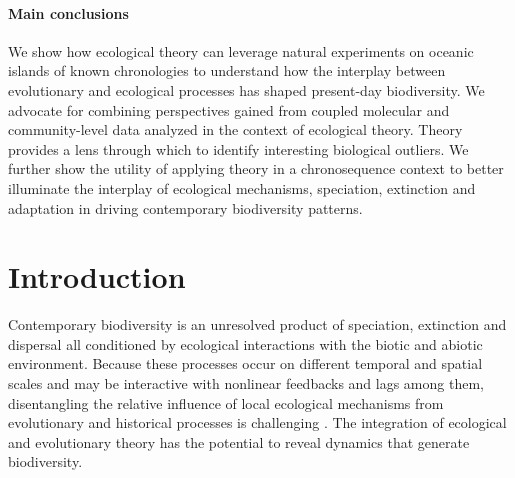 \documentclass[12pt]{article}
\begin{document}
\begin{linenumbers}
\paragraph{Main conclusions}
We show how ecological theory can leverage natural experiments on
oceanic islands of known chronologies to understand how the interplay
between evolutionary and ecological processes has shaped present-day
biodiversity. We advocate for combining perspectives gained from
coupled molecular and community-level data analyzed in the context of
ecological theory. Theory provides a lens through which to identify
interesting biological outliers. We further show the utility of applying
theory in a chronosequence context to better illuminate the interplay
of ecological mechanisms, speciation, extinction and adaptation in
driving contemporary biodiversity patterns.


\section*{Introduction}

Contemporary biodiversity is an unresolved product of speciation,
extinction and dispersal all conditioned by ecological interactions
with the biotic and abiotic environment.  Because these processes
occur on different temporal and spatial scales and may be interactive
with nonlinear feedbacks and lags among them, disentangling the
relative influence of local ecological mechanisms from evolutionary
and historical processes is challenging \citep{ricklefs2004}. The
integration of ecological and evolutionary theory has the potential to
reveal dynamics that generate biodiversity.


\end{linenumbers}
\end{document}
